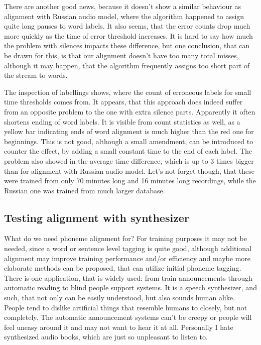 \documentclass[12pt,a4paper,english]{article}
\begin{document}
There are another good news, because it doesn't show a similar behaviour as alignment with Russian audio model, where the algorithm happened to assign quite long pauses to word labels.
It also seems, that the error counts drop much more quickly as the time of error threshold increases. It is hard to say how much the problem with silences impacts these difference, but one conclusion, that can be drawn for this, is that our alignment doesn't have too many total misses, although it may happen, that the algorithm frequently assigns too short part of the stream to words. \newline

The inspection of labellings shows, where the count of erroneous labels for small time thresholds comes from. It appears, that this approach does indeed suffer from an opposite problem to the one with extra silence parts. Apparently it often shortens ending of word labels. It is visible from count statistics as well, as a yellow bar indicating ends of word alignment is much higher than the red one for beginnings.
This is not good, although a small amendment, can be introduced to counter the effect, by adding a small constant time to the end of each label. \newline
The problem also showed in the average time difference, which is up to 3 times bigger than for alignment with Russian audio model. Let's not forget though, that these were trained from only 70 minutes long and 16 minutes long recordings, while the Russian one was trained from much larger database.

\newpage
\begin{center}
    \section{Testing alignment with synthesizer}
\end {center}
\setcounter{equation}{0}

What do we need phoneme alignment for? For training purposes it may not be needed, since a word or sentence level tagging is quite good, although additional alignment may improve training performance and/or efficiency and maybe more elaborate methods can be proposed, that can utilize initial phoneme tagging. \newline
There is one application, that is widely used: from train announcements through automatic reading to  blind people support systems. It is a speech synthesizer, and such, that not only can be easily understood, but also sounds human alike. People tend to dislike artificial things that resemble humans to closely, but not completely. The automatic announcement systems can't be creepy or people will feel uneasy around it and may not want to hear it at all. Personally I hate synthesized audio books, which are just so unpleasant to listen to. \newline
\end{document}

